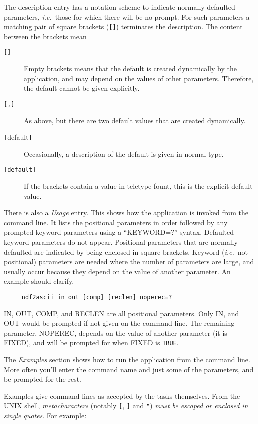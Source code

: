 \documentclass[twoside,11pt]{article}
\begin{document}
The description entry has a notation scheme to indicate 
normally defaulted parameters, {\it i.e.}\ those for which there will
be no prompt.
For such parameters a matching pair of square brackets (\verb![]!)
terminates the description.  The content between the brackets mean
\begin{description}
\item[\texttt{[]}]
Empty brackets means that the default is created dynamically
by the application, and may depend on the values of other parameters.
Therefore, the default cannot be given explicitly.
\item[\texttt{[,]}]
As above, but there are two default values that are created dynamically.
\item[\texttt{[}{\rm default}\texttt{]}]
Occasionally, a description of the default is given in normal type.
\item[\texttt{[default]}]
If the brackets contain a value in teletype-fount, this is the explicit
default value.
\end{description}

There is also a {\em Usage\/} entry.   \label{app_usage}
This shows how the  application is invoked from the command line.   It
lists the positional parameters in order followed by any prompted
keyword parameters using  a \mbox{``KEYWORD=?''} syntax.  Defaulted
keyword parameters do not appear.  Positional parameters that are
normally defaulted are indicated by being enclosed in square brackets.  
Keyword ({\it i.e.}\ not positional) parameters are needed where the
number of parameters are large, and usually occur because they depend on
the value of another parameter.  An example should clarify.
\smallskip

\begin{verbatim}
     ndf2ascii in out [comp] [reclen] noperec=?
\end{verbatim}
\normalsize
\smallskip

IN, OUT, COMP, and RECLEN are all positional
parameters.  Only IN, and OUT would be prompted if not given
on the command line. The remaining parameter, NOPEREC, depends on the
value of another parameter (it is FIXED), and will be prompted for when
FIXED is \texttt{TRUE}. 

The {\em Examples\/} section  \label{app_example}
shows how to run the application from the command line.  More often
you'll enter the command name and just some of the parameters, and be
prompted for the rest. 

Examples give command lines as accepted by the tasks themselves.  From
the UNIX shell, {\em metacharacters\/} (notably \texttt{[}, \texttt{]} and
\texttt{"})
{\em must be escaped or enclosed in single quotes}.  For example:
\end{document}
